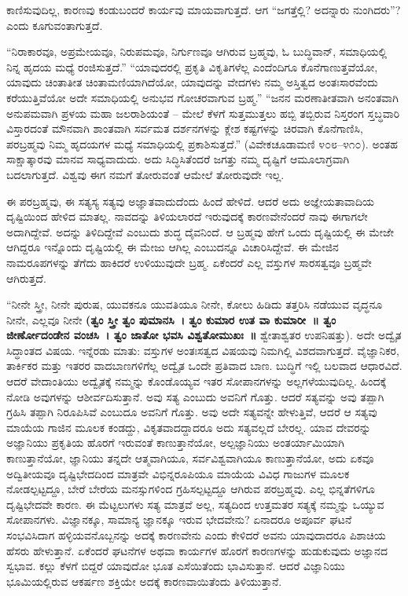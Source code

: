 ಕಾಣಿಸುವುದಿಲ್ಲ, ಕಾರಣವು ಕಂಡುಬಂದರೆ ಕಾರ್ಯವು ಮಾಯವಾಗುತ್ತದೆ. ಆಗ “ಜಗತ್ತೆಲ್ಲಿ? ಅದನ್ನಾರು ನುಂಗಿದರು”? ಎಂದು ಕೂಗುವಂತಾಗುತ್ತದೆ.

“ನಿರಾಕಾರವೂ, ಅಪ್ರಮೇಯವೂ, ನಿರುಪಮವೂ, ನಿರ್ಗುಣವೂ ಆಗಿರುವ ಬ್ರಹ್ಮವು, ಓ ಬುದ್ಧಿವಾನ್​, ಸಮಾಧಿಯಲ್ಲಿ ನಿನ್ನ ಹೃದಯ ಮಧ್ಯೆ ರಂಜಿಸುತ್ತದೆ.” “ಯಾವುದರಲ್ಲಿ ಪ್ರಕೃತಿ ವಿಕೃತಿಗಳೆಲ್ಲ ಎಂದೆಂದಿಗೂ ಕೊನೆಗಾಣುತ್ತವೆಯೋ, ಯಾವುದು ಚಿಂತಾತೀತ ಚಿಂತಾಮಣಿಯಾಗಿದೆಯೋ, ಯಾವುದನ್ನು ವೇದಗಳು ನಮ್ಮ ಅಸ್ತಿತ್ವದ ಅಂತಃಸಾರವೆಂದು ಕರೆಯುತ್ತಿವೆಯೋ ಅದೇ ಸಮಾಧಿಯಲ್ಲಿ ಅನುಭವ ಗೋಚರವಾಗುವ ಬ್ರಹ್ಮ.” “ಜನನ ಮರಣಾತೀತವಾಗಿ ಅನಂತವಾಗಿ ಅನುಪಮವಾಗಿ ಪ್ರಳಯ ಮಹಾ ಜಲರಾಶಿಯಂತೆ – ಮೇಲೆ ಕೆಳಗೆ ಸುತ್ತಮುತ್ತಲು ಹಬ್ಬಿ ತಬ್ಬಿರುವ ನಿಸ್ತರಂಗ ಸ್ತಬ್ಧವಾರಿ ವಿಸ್ತಾರದಂತೆ ಮೌನವಾಗಿ ಶಾಂತವಾಗಿ ಸರ್ವಮತ ದರ್ಶನಗಳನ್ನು ಕ್ಲೇಶ ಕಷ್ಟಗಳನ್ನು ಚಿರವಾಗಿ ಕೊನೆಗಾಣಿಸಿ, ಪರಬ್ರಹ್ಮವು ನಿಮ್ಮ ಹೃದಯಗಳ ಮಧ್ಯೆ ಸಮಾಧಿಯಲ್ಲಿ ಪ್ರಕಾಶಿಸುತ್ತದೆ.” (ವಿವೇಕಚೂಡಾಮಣಿ ೪೦೮–೪೧೦). ಅಂತಹ ಸಾಕ್ಷಾತ್ಕಾರವು ಮಾನವ ಸಾಧ್ಯವಾದುದು. ಅದು ಸಿದ್ಧಿಸಿತೆಂದರೆ ಜಗತ್ತು ನಮ್ಮ ದೃಷ್ಟಿಗೆ ಆಮೂಲಾಗ್ರವಾಗಿ ಬದಲಾಗುತ್ತದೆ. ವಿಶ್ವವು ಈಗ ನಮಗೆ ತೋರುವಂತೆ ಆಮೇಲೆ ತೋರುವುದೇ ಇಲ್ಲ.

ಈ ಪರಬ್ರಹ್ಮವು, ಈ ಸತ್ಯಸ್ಯ ಸತ್ಯವು ಅಜ್ಞಾತವಾದುದೆಂದು ಹಿಂದೆ ಹೇಳಿದೆ. ಆದರೆ ಅದು ಅಜ್ಞೇಯತಾವಾದಿಯ ದೃಷ್ಟಿಯಿಂದ ಹೇಳಿದ ಮಾತಲ್ಲ. ನಾವದನ್ನು ತಿಳಿಯಲಾರದೆ ಇರುವುದಕ್ಕೆ ಕಾರಣವೇನೆಂದರೆ ನಾವು ಈಗಾಗಲೇ ಅದಾಗಿದ್ದೇವೆ. ಅದನ್ನು ತಿಳಿದಿದ್ದೇವೆ ಎಂಬುದು ಶುದ್ಧ ದೈವನಿಂದೆ. ಆ ಬ್ರಹ್ಮವು ಹೇಗೆ ಒಂದು ದೃಷ್ಟಿಯಲ್ಲಿ ಈ ಮೇಜೇ ಆಗಿದ್ದರೂ ಇನ್ನೊಂದು ದೃಷ್ಟಿಯಲ್ಲಿ ಈ ಮೇಜು ಆಗಿಲ್ಲ ಎಂಬುದನ್ನೂ ವಿಚಾರಿಸಿದ್ದೇವೆ. ಈ ಮೇಜಿನ ನಾಮರೂಪಗಳನ್ನು ತೆಗೆದು ಹಾಕಿದರೆ ಉಳಿಯುವುದೇ ಬ್ರಹ್ಮ. ಏಕೆಂದರೆ ಎಲ್ಲ ವಸ್ತುಗಳ ಸಾರಸತ್ವವೂ ಬ್ರಹ್ಮವೇ ಆಗಿರುತ್ತದೆ.

“ನೀನೇ ಸ್ತ್ರೀ, ನೀನೇ ಪುರುಷ, ಯುವಕನೂ ಯುವತಿಯೂ ನೀನೇ, ಕೋಲು ಹಿಡಿದು ತತ್ತರಿಸಿ ನಡೆಯುವ ವೃದ್ಧನೂ ನೀನೇ, ಎಲ್ಲವೂ ನೀನೇ \textbf{(ತ್ವಂ ಸ್ತ್ರೀ ತ್ವಂ ಪುಮಾನಸಿ~। ತ್ವಂ ಕುಮಾರ ಉತ ವಾ ಕುಮಾರೀ~॥ ತ್ವಂ ಜೀರ್ಣೋದಂಡೇನ ವಂಚಸಿ~। ತ್ವಂ ಜಾತೋ ಭವಸಿ ವಿಶ್ವತೋಮುಖಃ~॥} ಶ್ವೇತಾಶ್ವತರ ಉಪನಿಷತ್ತು). ಅದೇ ಅದ್ವೈತ ಸಿದ್ಧಾಂತದ ವಿಷಯ. ಇನ್ನೆರಡು ಮಾತು: ವಸ್ತುಗಳ ಅಂತಃಸತ್ವದ ವಿಷಯವು ನಿಮಗಿಲ್ಲಿ ವಿಶದವಾಗುತ್ತದೆ. ವೈಜ್ಞಾನಿಕರ, ತಾರ್ಕಿಕರ ಮತ್ತು ಇತರರ ವಾದಬಾಣಗಳಿಗೆಲ್ಲ ಅದ್ವೈತ ಒಂದೇ ಪ್ರತಿವಾದ ಬಾಣ. ಬುದ್ಧಿಗೆ ಇಲ್ಲಿ ಬಲವಾದ ಆಧಾರವಿದೆ. ಆದರೆ ವೇದಾಂತಿಯು ಅದ್ವೈತಕ್ಕೆ ನಮ್ಮನ್ನು ಕೊಂಡೊಯ್ಯವ ಇತರ ಸೋಪಾನಗಳನ್ನು ಅಲ್ಲಗಳೆಯುವುದಿಲ್ಲ. ಹಿಂದಕ್ಕೆ ನೋಡಿ ಅವುಗಳನ್ನು ಆಶೀರ್ವದಿಸುತ್ತಾನೆ. ಅವು ಸತ್ಯ ಎಂಬುದು ಅವನಿಗೆ ಗೊತ್ತು. ಆದರೆ ಸತ್ಯವನ್ನು ಅವು ತಪ್ಪಾಗಿ ಗ್ರಹಿಸಿ ತಪ್ಪಾಗಿ ನಿರೂಪಿಸಿವೆ ಎಂಬುದೂ ಅವನಿಗೆ ಗೊತ್ತು. ಅವು ಅದೇ ಸತ್ಯವನ್ನೇ ಹೇಳುತ್ತಿವೆ, ಆದರೆ ಆ ಸತ್ಯವು ಮಾಯೆಯ ಗಾಜಿನ ಮೂಲಕ ಕಂಡದ್ದು, ವಿಕೃತವಾದದ್ದಾದರೂ ಅದು ಸತ್ಯವಲ್ಲದೆ ಬೇರಲ್ಲ. ಯಾವ ದೇವರನ್ನು ಅಜ್ಞಾನಿಯು ಪ್ರಕೃತಿಯ ಹೊರಗೆ ಇರುವಂತೆ ಕಾಣುತ್ತಾನೆಯೋ, ಅಲ್ಪಜ್ಞಾನಿಯು ಅಂತರ್ಯಾಮಿಯಾಗಿ ಕಾಣುತ್ತಾನೆಯೋ, ಜ್ಞಾನಿಯು ತನ್ನದೇ ಆತ್ಮವಾಗಿಯೂ, ಸರ್ವವಿಶ್ವವಾಗಿಯೂ ಕಾಣುತ್ತಾನೆಯೋ, ಅದು ಏಕವೂ ಅದ್ವಿತೀಯವೂ ದೃಷ್ಟಿಭೇದದಿಂದ ಮಾತ್ರವೇ ವಿಭಿನ್ನರೂಪಿಯೂ ಮಾಯೆಯ ವಿವಿಧ ಗಾಜುಗಳ ಮೂಲಕ ನೋಡಲ್ಪಟ್ಟದ್ದೂ, ಬೇರೆ ಬೇರೆಯ ಮನಸ್ಸುಗಳಿಂದ ಗ್ರಹಿಸಲ್ಪಟ್ಟದ್ದೂ ಆಗಿರುವ ಪರಬ್ರಹ್ಮವು. ಎಲ್ಲ ಭಿನ್ನತೆಗಳಿಗೂ ದೃಷ್ಟಿಭೇದವೇ ಕಾರಣ. ಈ ಮೆಟ್ಟಲುಗಳು ಸತ್ಯ ಮಾತ್ರವೆ ಅಲ್ಲ, ಸತ್ಯದಿಂದ ಉತ್ತಮತರ ಸತ್ಯಕ್ಕೆ ನಮ್ಮನ್ನು ಒಯ್ಯುವ ಸೋಪಾನಗಳು. ವಿಜ್ಞಾನಕ್ಕೂ, ಸಾಮಾನ್ಯ ಜ್ಞಾನಕ್ಕೂ ಇರುವ ಭೇದವೇನು? ಏನಾದರೂ ಅಪೂರ್ವ ಘಟನೆ ಸಂಭವಿಸಿದಾಗ ಹಳ್ಳಿಯವನೊಬ್ಬನನ್ನು ಅದಕ್ಕೆ ಕಾರಣವೇನು ಎಂದು ಕೇಳಿದರೆ ಅವನು ಯಾವುದಾದರೂ ಪಿಶಾಚಿಯ ಹೆಸರು ಹೇಳುತ್ತಾನೆ. ಏಕೆಂದರೆ ಘಟನೆಗಳ ಅಥವಾ ಕಾರ್ಯಗಳ ಹೊರಗೆ ಕಾರಣಗಳನ್ನು ಹುಡುಕುವುದು ಅಜ್ಞಾನದ ಸ್ವಭಾವ. ಕಲ್ಲು ಕೆಳಗೆ ಬಿದ್ದರೆ ಯಾವುದೋ ಭೂತ ಎಸೆಯಿತೆಂದು ಭಾವಿಸುತ್ತಾನೆ. ಆದರೆ ವಿಜ್ಞಾನಿಯು ಭೂಮಿಯಲ್ಲಿರುವ ಆಕರ್ಷಣ ಶಕ್ತಿಯೇ ಅದಕ್ಕೆ ಕಾರಣವಾಯಿತೆಂದು ತಿಳಿಯುತ್ತಾನೆ.

